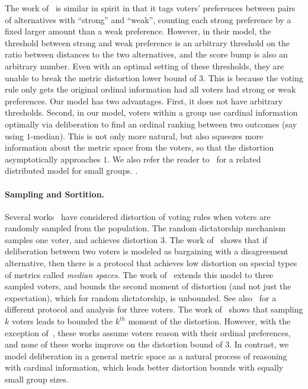The work of~\cite{Strength} is similar in spirit in that it tags voters' preferences between pairs of alternatives with ``strong'' and ``weak'', counting each strong preference by a fixed larger amount than a weak preference.  However, in their model, the threshold between strong and weak preference is an arbitrary threshold on the ratio between distances to the two alternatives, and the score bump is also an arbitrary number. Even with an optimal setting of these thresholds, they are unable to break the metric distortion lower bound of $3$. This is because the voting rule only gets the original ordinal information had all voters had strong or weak preferences.  Our model has two advantages. First, it does not have arbitrary thresholds. Second, in our model, voters within a group use cardinal information optimally via deliberation  to find an ordinal ranking between two outcomes (say using $1$-median). This is not only more natural, but also squeezes more information about the metric space from the voters, so that the distortion asymptotically approaches $1$.  We also refer the reader to~\cite{Distributed} for a related distributed model for small groups. . %

\paragraph{Sampling and Sortition.} Several works~\cite{FainGMS17,FainGMP19,FainFM20,CaragiannisM024} have considered distortion of voting rules when voters are randomly sampled from the population. The random dictatorship mechanism samples one voter, and achieves distortion $3$. The work of~\cite{FainGMS17} shows that if deliberation between two voters is modeled as bargaining with a disagreement alternative, then there is a protocol that achieves low distortion on special types of metrics called {\em median spaces}. The work of~\cite{FainGMP19} extends this model to three sampled voters, and bounds the second moment of distortion (and not just the expectation), which for random dictatorship, is unbounded. See also~\cite{GoelLee} for a different protocol and analysis for three voters. The work of~\cite{FainFM20} shows that sampling $k$ voters leads to bounded the $k^{th}$ moment of the distortion. However, with the exception of~\cite{FainGMS17}, these works assume voters reason with their ordinal preferences, and none of these works improve on the distortion bound of $3$. In contrast, we model deliberation in a general metric space as a natural process of reasoning with cardinal information, which leads better distortion bounds with equally small group sizes.

